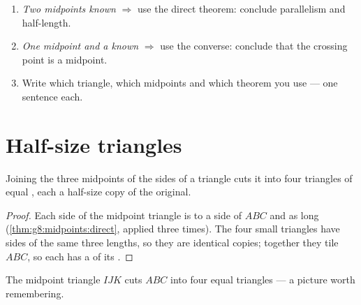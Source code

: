\begin{method}\label{met:g8:midpoints:choose}
\begin{enumerate}
  \item \emph{Two midpoints known} $\Rightarrow$ use the direct
        theorem: conclude parallelism and half-length.
  \item \emph{One midpoint and a  known} $\Rightarrow$ use
        the converse: conclude that the crossing point is a midpoint.
  \item Write which triangle, which midpoints and which theorem you
        use --- one sentence each.
\end{enumerate}
\end{method}

\section{Half-size triangles}

\begin{proposition}\label{prop:g8:midpoints:medial}
Joining the three midpoints of the sides of a triangle cuts it into
four triangles of equal , each a half-size copy of the original.
\end{proposition}

\begin{proof}
Each side of the midpoint triangle is  to a side of $ABC$ and
 as long (\cref{thm:g8:midpoints:direct}, applied three times).
The four small triangles have sides of the same three lengths, so
they are identical copies; together they tile $ABC$, so each has a
 of its .
\end{proof}

\begin{omfigure}

{\small The midpoint triangle $IJK$ cuts $ABC$ into four equal
triangles --- a picture worth remembering.}
\end{omfigure}

